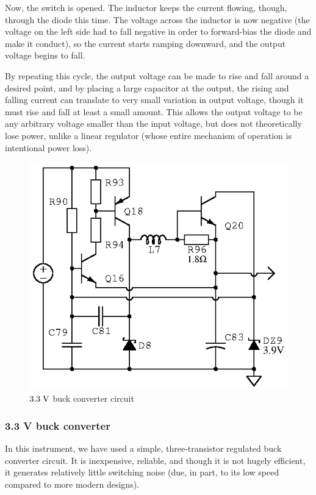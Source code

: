 Now, the switch is opened. The inductor keeps the current flowing, though,
through the diode this time. The voltage across the inductor is now negative
(the voltage on the left side had to fall negative in order to forward-bias the
diode and make it conduct), so the current starts ramping downward, and the
output voltage begins to fall.~\cite[pp.~356--357]{aoe-vreg}

By repeating this cycle, the output voltage can be made to rise and fall around
a desired point, and by placing a large capacitor at the output, the rising and
falling current can translate to very small variation in output voltage, though
it must rise and fall at least a small amount. This allows the output voltage
to be any arbitrary voltage smaller than the input voltage, but does not
theoretically lose power, unlike a linear regulator (whose entire mechanism of
operation is intentional power loss).


\begin{figure}[H]
\centering
\includegraphics{too/3v3buck}
\caption{$3.3\;\mathrm{V}$ buck converter circuit}
\label{fig:3v3buck}
\end{figure}

\subsubsection{3.3 V buck converter}

In this instrument, we have used a simple, three-transistor regulated buck
converter circuit. It is inexpensive, reliable, and though it is not hugely
efficient, it generates relatively little switching noise (due, in part, to
its low speed compared to more modern designs).

